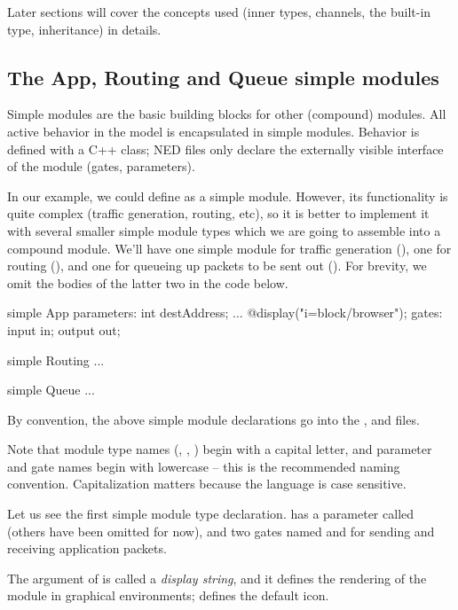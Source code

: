 Later sections will cover the concepts used (inner types, channels, the
 built-in type, inheritance) in details.


\subsection{The App, Routing and Queue simple modules}

Simple modules are the basic building blocks for other (compound) modules.
All active behavior in the model is encapsulated in simple modules.
Behavior is defined with a C++ class; NED files only declare the externally
visible interface of the module (gates, parameters).

In our example, we could define  as a simple module. However,
its functionality is quite complex (traffic generation, routing, etc),
so it is better to implement it with several smaller simple module types
which we are going to assemble into a compound module. We'll have
one simple module for traffic generation (), one for routing
(), and one for queueing up packets to be sent out ().
For brevity, we omit the bodies of the latter two in the code below.

\begin{ned}
simple App
{
    parameters:
        int destAddress;
        ...
        @display("i=block/browser");
    gates:
        input in;
        output out;
}

simple Routing
{
    ...
}

simple Queue
{
    ...
}
\end{ned}

By convention, the above simple module declarations go into the
,  and  files.

\begin{note}
    Note that module type names (, , )
    begin with a capital letter, and parameter and gate names begin with
    lowercase -- this is the recommended naming convention. Capitalization
    matters because the language is case sensitive.
\end{note}

Let us see the first simple module type declaration.  has a
parameter called  (others have been omitted for now),
and two gates named  and  for sending and receiving
application packets.

The argument of  is called a \textit{display string},
and it defines the rendering of the module in graphical environments;
 defines the default icon.

